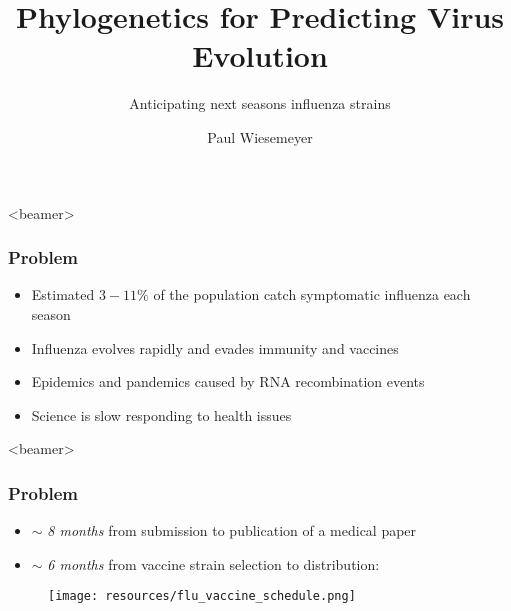 \documentclass{beamer}
\title{Phylogenetics for Predicting Virus Evolution}
\subtitle{Anticipating next seasons influenza strains}
\author{Paul Wiesemeyer}
\begin{document}
  \shorthandoff{-}
  \frame{\maketitle}

  
    
  \begin{darkframes}




  \begin{frame}<beamer>
    \frametitle{Problem}


    \begin{itemize}
      \itemsep1em
      \item Estimated $3 - 11 \% $ of the population catch symptomatic influenza each season \cite{tokarsOlsen+18a}
      \item Influenza evolves rapidly and evades immunity and vaccines
      \item Epidemics and pandemics caused by RNA recombination events
      \item Science is slow responding to health issues
    \end{itemize}
  \end{frame}

  \begin{frame}<beamer>
    \frametitle{Problem}
    \begin{itemize}
      \item $\sim$ \textit{8 months} from submission to publication of a medical paper \cite{aAMC18}
      \item $\sim$ \textit{6 months} from vaccine strain selection to distribution:
    \end{itemize}
    \begin{figure}
        \texttt{[image: resources/flu\_vaccine\_schedule.png]}
        \caption{\cite{bedford15}}
    \end{figure}{}
  \end{frame}






\end{darkframes}
\end{document}

